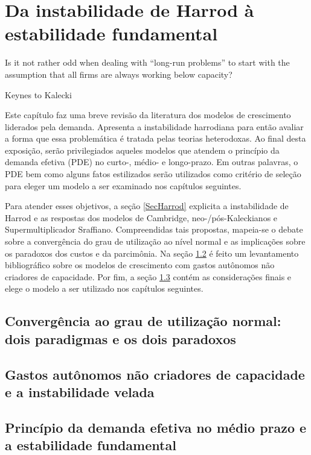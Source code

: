 \chapter{Da instabilidade de Harrod à estabilidade fundamental}

\epigraph{Is it not rather odd when dealing with ``long-run problems'' to start with the assumption that all firms are always working below capacity?}{Keynes to Kalecki}


Este capítulo faz uma breve revisão da literatura dos modelos de crescimento liderados pela demanda. Apresenta a instabilidade harrodiana para então avaliar a forma que essa problemática é tratada pelas teorias heterodoxas.
Ao final desta exposição, serão privilegiados aqueles modelos que atendem o princípio da demanda efetiva (PDE) no curto-, médio- e longo-prazo. Em outras palavras, o PDE bem como alguns fatos estilizados serão utilizados como critério de seleção para eleger um modelo a ser examinado nos capítulos seguintes.



Para atender esses objetivos, a seção \ref{SecHarrod} explicita a instabilidade de Harrod e as respostas dos modelos de Cambridge, neo-/pós-Kaleckianos e Supermultiplicador Sraffiano. Compreendidas tais propostas, mapeia-se o debate sobre a convergência do grau de utilização ao nível normal e as implicações sobre os paradoxos dos custos e da parcimônia. Na seção \ref{Literatura} é feito um levantamento bibliográfico sobre os modelos de crescimento com gastos autônomos não criadores de capacidade. Por fim, a seção \ref{Concl1} contém as considerações finais e elege o modelo a ser utilizado nos capítulos seguintes.




\section{Convergência ao grau de utilização normal: dois paradigmas e os dois paradoxos}\label{debate}
%

\section{Gastos autônomos não criadores de capacidade e a instabilidade velada}\label{Literatura}
%

\section{Princípio da demanda efetiva no médio prazo e a estabilidade fundamental} \label{Concl1}
%
